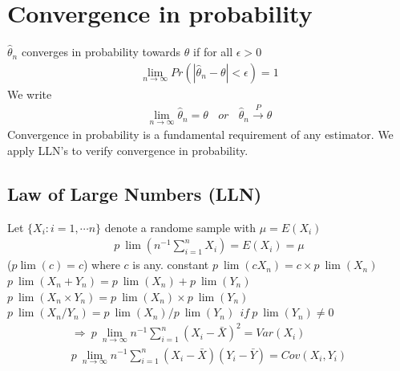 \documentclass[a4paper,twoside,11pt]{article}
\begin{document}
\section{Convergence in probability}
$\hat \theta_n$ converges in probability towards $\theta$ if for all $\epsilon >0$ 
\begin{equation*}
\begin{aligned}
\underset{n \rightarrow \infty}{\lim} Pr(|\hat \theta_n - \theta | < \epsilon) =1
\end{aligned}
\end{equation*}
We write
\begin{equation*}
\begin{aligned}
\underset{n \rightarrow \infty}{\lim} \hat \theta_n = \theta \ \ \ \ or \ \ \ \ \hat \theta_n \overset{P}{\rightarrow} \theta
\end{aligned}
\end{equation*}
Convergence in probability is a fundamental requirement of any
estimator.
\newline
\textcolor{NavyBlue}{We apply LLN’s to verify convergence in probability.}
\begin{shaded*}
\subsection{Law of Large Numbers (LLN)} 
Let $\{ X_i : i=1,\cdots n\}$ denote a randome sample with $\mu = E(X_i)$
\begin{equation*}
\begin{aligned}
p \ \lim (n^{-1} \sum^n_{i=1} X_i ) = E(X_i) = \mu
\end{aligned}
\end{equation*}
($p \lim (c) = c$) where $c$ is any. constant 
\newline
$p \ \lim(c X_n) = c \times p \ \lim(X_n)$ 
\newline
$p \ \lim(X_n + Y_n) = p \ \lim(X_n) + p \ \lim(Y_n)$ 
\newline
$p \ \lim(X_n \times Y_n) = p \ \lim(X_n) \times p \ \lim (Y_n)$ 
\newline
$p \ \lim(X_n/Y_n) = p \ \lim(X_n) / p \ \lim (Y_n) \ \ if \ p \ \lim(Y_n) \ne 0$
\begin{equation*}
\begin{aligned}
\Rightarrow \ p \ \underset{n \rightarrow \infty}{\lim} n^{-1} \sum^n_{i=1} (X_i - \bar X)^2 = Var(X_i) \\ 
p \ \underset{n \rightarrow \infty}{\lim} n^{-1} \sum^n_{i=1} (X_i -\bar X) (Y_i - \bar Y) = Cov(X_i, Y_i)
\end{aligned}
\end{equation*}
\end{shaded*}
\end{document}
